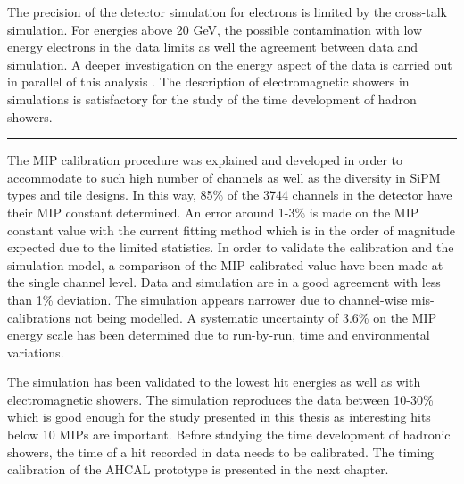 The precision of the detector simulation for electrons is limited by the cross-talk simulation. For energies above 20 GeV, the possible contamination with low energy electrons in the data limits as well the agreement between data and simulation. A deeper investigation on the energy aspect of the data is carried out in parallel of this analysis \cite{AmbraEnergy}. The description of electromagnetic showers in simulations is satisfactory for the study of the time development of hadron showers.

\begin{center}
	\rule{0.5\textwidth}{.4pt}
\end{center}

The MIP calibration procedure was explained and developed in order to accommodate to such high number of channels as well as the diversity in SiPM types and tile designs. In this way, 85\% of the 3744 channels in the detector have their MIP constant determined. An error around 1-3\% is made on the MIP constant value with the current fitting method which is in the order of magnitude expected due to the limited statistics. In order to validate the calibration and the simulation model, a comparison of the MIP calibrated value have been made at the single channel level. Data and simulation are in a good agreement with less than 1\% deviation. The simulation appears narrower due to channel-wise mis-calibrations not being modelled. A systematic uncertainty of 3.6\% on the MIP energy scale has been determined due to run-by-run, time and environmental variations.

The simulation has been validated to the lowest hit energies as well as with electromagnetic showers. The simulation reproduces the data between 10-30\% which is good enough for the study presented in this thesis as interesting hits below 10 MIPs are important. Before studying the time development of hadronic showers, the time of a hit recorded in data needs to be calibrated. The timing calibration of the AHCAL prototype is presented in the next chapter.
